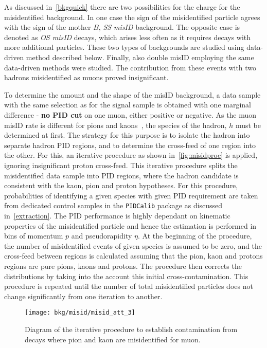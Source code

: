 As discussed in~\autoref{bkgquick} there are two possibilities for the charge for the misidentified background. In one case the sign of the misidentified particle agrees with the sign of the mother $B$, \textit{SS misID} background. The opposite case is denoted as \textit{OS misID} decays, which arises less often as it requires decays with more additional particles. These two types of backgrounds are studied using data-driven method described below. Finally, also double misID employing the same data-driven methods were studied. The contribution from these events with two hadrons misidentified as muons proved insignificant.


To determine the amount and the shape of the misID background, a data sample with the same selection as for the signal sample is obtained with one marginal difference - \textbf{no \gls{PID} cut} on one muon, either positive or negative. As the muon misID rate is different for pions and kaons~\cite{LHCb-DP-2013-001}, the species of the hadron, $h$ must be determined at first. The strategy for this purpose is to isolate the hadron into separate hadron \gls{PID} regions, and to determine the cross-feed of one region into the other. For this, an iterative procedure as shown in~\autoref{fig:misidproc} is applied, ignoring insignificant proton cross-feed. This iterative procedure splits the misidentified data sample into \gls{PID} regions, where the hadron candidate is consistent with the kaon, pion and proton hypotheses. For this procedure, probabilities of identifying a given species with given \gls{PID} requirement are taken from dedicated control samples in the \texttt{PIDCalib} package \cite{Anderlini:2202412} as discussed in~\autoref{extraction}. The \gls{PID} performance is highly dependant on kinematic properties of the misidentified particle and hence the estimation is performed in bins of momentum $p$ and pseudorapidity $\eta$.
At the beginning of the procedure, the number of misidentified events of given species is assumed to be zero, and the
cross-feed between regions is calculated assuming that the pion, kaon and protons regions are pure pions, kaons and protons.
The procedure then corrects the distributions by taking into the account this initial cross-contamination.
This procedure is repeated until the number of total misidentified particles does not change significantly from one iteration to another.

\begin{figure}[h]
  \begin{center}
    \texttt{[image: bkg/misid/misid\_att\_3]}%
    \vspace*{-0.5cm}
  \end{center}
  \caption{
    Diagram of the iterative procedure to establish contamination from decays where pion and kaon are misidentified for muon.
    }
  \label{fig:misidproc}
\end{figure}



